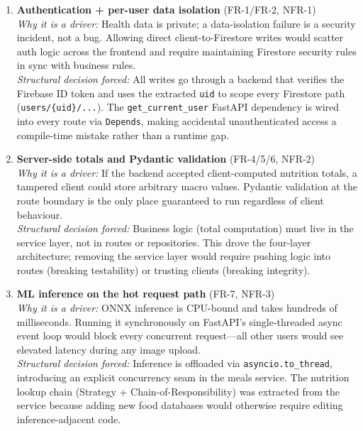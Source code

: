 \documentclass[11pt]{article}
\begin{document}
\begin{enumerate}[leftmargin=1.4em]

  \item \textbf{Authentication + per-user data isolation} (FR-1/FR-2, NFR-1) \\
  \textit{Why it is a driver:} Health data is private; a data-isolation failure is a security
  incident, not a bug. Allowing direct client-to-Firestore writes would scatter auth logic
  across the frontend and require maintaining Firestore security rules in sync with business
  rules. \\
  \textit{Structural decision forced:} All writes go through a backend that verifies the
  Firebase ID token and uses the extracted \texttt{uid} to scope every Firestore path
  (\texttt{users/\{uid\}/...}). The \texttt{get\_current\_user} FastAPI dependency is wired
  into every route via \texttt{Depends}, making accidental unauthenticated access a compile-time
  mistake rather than a runtime gap.

  \item \textbf{Server-side totals and Pydantic validation} (FR-4/5/6, NFR-2) \\
  \textit{Why it is a driver:} If the backend accepted client-computed nutrition totals, a
  tampered client could store arbitrary macro values. Pydantic validation at the route boundary
  is the only place guaranteed to run regardless of client behaviour. \\
  \textit{Structural decision forced:} Business logic (total computation) must live in the
  service layer, not in routes or repositories. This drove the four-layer architecture; removing
  the service layer would require pushing logic into routes (breaking testability) or trusting
  clients (breaking integrity).

  \item \textbf{ML inference on the hot request path} (FR-7, NFR-3) \\
  \textit{Why it is a driver:} ONNX inference is CPU-bound and takes hundreds of milliseconds.
  Running it synchronously on FastAPI's single-threaded async event loop would block every
  concurrent request---all other users would see elevated latency during any image upload. \\
  \textit{Structural decision forced:} Inference is offloaded via \texttt{asyncio.to\_thread},
  introducing an explicit concurrency seam in the meals service. The nutrition lookup chain
  (Strategy + Chain-of-Responsibility) was extracted from the service because adding new food
  databases would otherwise require editing inference-adjacent code.


\end{enumerate}
\end{document}

